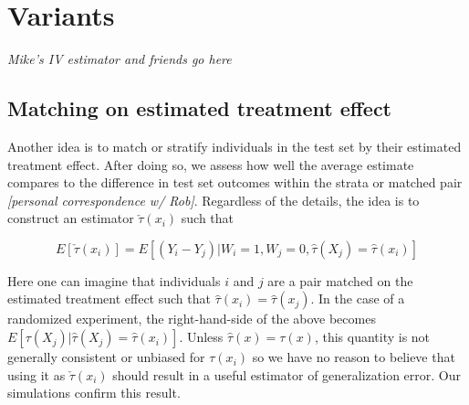 \section{Variants}
\label{variants}

\emph{Mike's IV estimator and friends go here}

\subsection{Matching on estimated treatment effect}

\label{te-match}

Another idea is to match or stratify individuals in the test set by their estimated treatment effect. After doing so, we assess how well the average estimate compares to the difference in test set outcomes within the strata or matched pair \emph{[personal correspondence w/ Rob]}. Regardless of the details, the idea is to construct an estimator $\check\tau(x_i)$ such that 

\[
E[\check\tau(x_i)] = E[(Y_i - Y_j) | W_i = 1, W_j=0, \hat\tau(X_j) = \hat\tau(x_i)]
\]

Here one can imagine that individuals $i$ and $j$ are a pair matched on the estimated treatment effect such that $\hat\tau(x_i) = \hat\tau(x_j)$. In the case of a randomized experiment, the right-hand-side of the above becomes $E[ \tau(X_j) | \hat\tau(X_j) = \hat\tau(x_i)]$. Unless $\hat\tau(x) = \tau(x)$, this quantity is not generally consistent or unbiased for $\tau(x_i)$ so we have no reason to believe that using it as $\check \tau(x_i)$ should result in a useful estimator of generalization error. Our simulations confirm this result.


